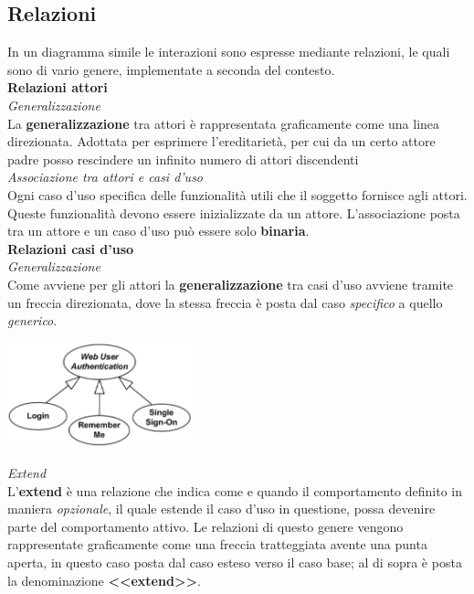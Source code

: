 \documentclass{article}
\begin{document}
\subsection*{Relazioni}
\large
In un diagramma simile le interazioni sono espresse mediante relazioni, le quali sono di vario genere, implementate a seconda del contesto.\vspace*{14pt}\\
\textbf{Relazioni attori}\\
\textit{Generalizzazione}\\La \textbf{generalizzazione} tra attori è rappresentata graficamente come una linea direzionata. Adottata per esprimere l'ereditarietà, per cui da un certo attore padre posso rescindere un infinito numero di attori discendenti\vspace*{14pt}\\
\textit{Associazione tra attori e casi d'uso}\\Ogni caso d'uso specifica delle funzionalità utili che il soggetto fornisce agli attori. Queste funzionalità devono essere inizializzate da un attore. L'associazione posta tra un attore e un caso d'uso può essere solo \textbf{binaria}.\vspace*{14pt}\\
\textbf{Relazioni casi d'uso}\\
\textit{Generalizzazione}\\Come avviene per gli attori la \textbf{generalizzazione} tra casi d'uso avviene tramite un freccia direzionata, dove la stessa freccia è posta dal caso \textit{specifico} a quello \textit{generico}.
\begin{center}
    \includegraphics[width=0.4\textwidth]{foto 3.png}
\end{center}
\textit{Extend}\\L'\textbf{extend} è una relazione che indica come e quando il comportamento definito in maniera \textit{opzionale}, il quale estende il caso d'uso in questione, possa devenire parte del comportamento attivo. Le relazioni di questo genere vengono rappresentate graficamente come una freccia tratteggiata avente una punta aperta, in questo caso posta dal caso esteso verso il caso base; al di sopra è posta la denominazione \textbf{<<extend>>}.
\end{document}
